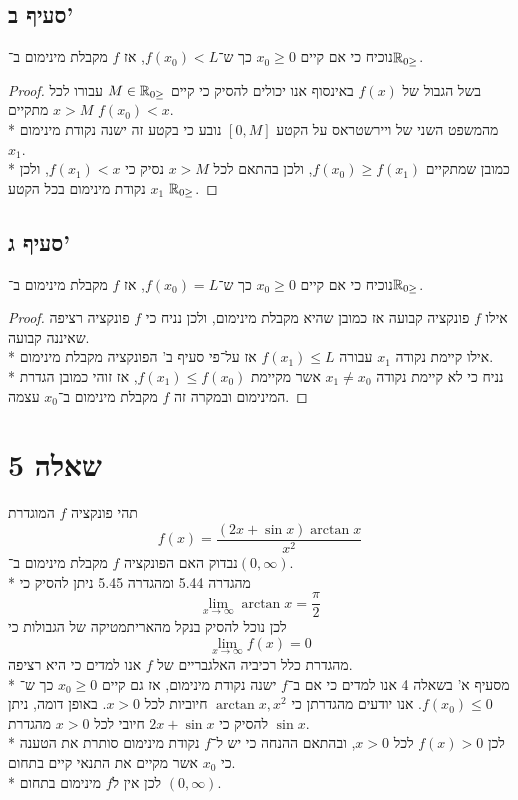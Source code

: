 \subsection{סעיף ב'}
נוכיח כי אם קיים $x_0 \ge 0$ כך ש־$f(x_0) < L$, אז $f$ מקבלת מינימום ב־$\mathbb{R}_{0\ge}$.
\begin{proof}
	בשל הגבול של $f(x)$ באינסוף אנו יכולים להסיק כי קיים $M \in \mathbb{R}_{0\ge}$ עבורו לכל $x > M$ מתקיים $f(x_0) < x$. \\* %
	מהמשפט השני של ויירשטראס על הקטע $[0, M]$ נובע כי בקטע זה ישנה נקודת מינימום $x_1$. \\*
	כמובן שמתקיים $f(x_0) \ge f(x_1)$, ולכן בהתאם לכל $x > M$ נסיק כי $f(x_1) < x$, ולכן $x_1$ נקודת מינימום בכל הקטע $\mathbb{R}_{0\ge}$.
\end{proof}

\subsection{סעיף ג'}
נוכיח כי אם קיים $x_0 \ge 0$ כך ש־$f(x_0) = L$, אז $f$ מקבלת מינימום ב־$\mathbb{R}_{0\ge}$.
\begin{proof}
	אילו $f$ פונקציה קבועה אז כמובן שהיא מקבלת מינימום, ולכן נניח כי $f$ פונקציה רציפה שאיננה קבועה. \\*
	אילו קיימת נקודה $x_1$ עבורה $f(x_1) \le L$ אז על־פי סעיף ב' הפונקציה מקבלת מינימום. \\*
	נניח כי לא קיימת נקודה $x_1 \ne x_0$ אשר מקיימת $f(x_1) \le f(x_0)$, אז זוהי כמובן הגדרת המינימום ובמקרה זה $f$ מקבלת מינימום ב־$x_0$ עצמה.
\end{proof}

\section{שאלה 5}
תהי פונקציה $f$ המוגדרת
\[
	f(x) = \frac{(2x + \sin x) \arctan x}{x^2}
\]
נבדוק האם הפונקציה $f$ מקבלת מינימום ב־$(0, \infty)$. \\*
מהגדרה 5.44 ומהגדרה 5.45 ניתן להסיק כי
\[
	\lim_{x \to \infty} \arctan x = \frac{\pi}{2}
\]
לכן נוכל להסיק בנקל מהאריתמטיקה של הגבולות כי
\[
	\lim_{x \to \infty} f(x) = 0
\]
מהגדרת כלל רכיביה האלגבריים של $f$ אנו למדים כי היא רציפה. \\*
מסעיף א' בשאלה 4 אנו למדים כי אם ב־$f$ ישנה נקודת מינימום, אז גם קיים $x_0 \ge 0$ כך ש־$f(x_0) \le 0$.
אנו יודעים מהגדרתן כי $\arctan x, x^2$ חיוביות לכל $x > 0$. באופן דומה, ניתן להסיק כי $2x + \sin x$ חיובי לכל $x > 0$ מהגדרת $\sin x$. \\*
לכן $f(x) > 0$ לכל $x > 0$, ובהתאם ההנחה כי יש ל־$f$ נקודת מינימום סותרת את הטענה כי $x_0$ אשר מקיים את התנאי קיים בתחום. \\*
לכן אין ל$f$ מינימום בתחום $(0, \infty)$.

